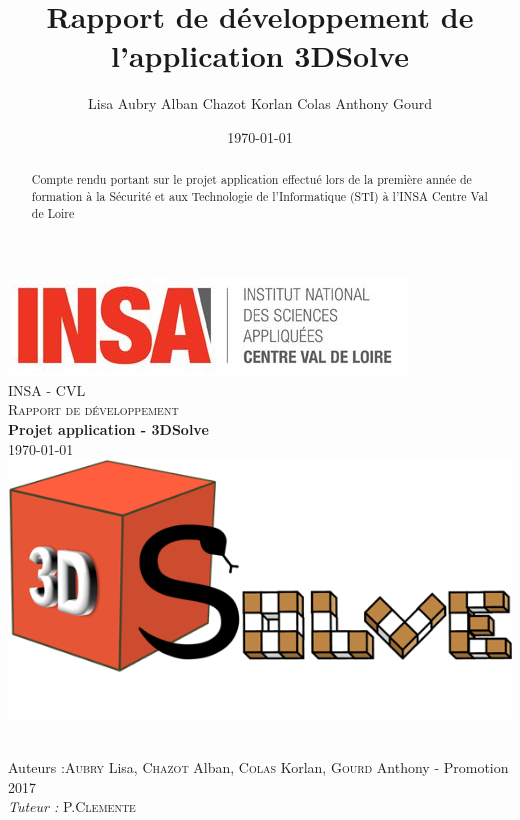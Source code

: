 \documentclass[a4paper,10pt]{report}
\title{Rapport de développement de l'application 3DSolve}
\author{Lisa Aubry Alban Chazot Korlan Colas Anthony Gourd}
\date{\today}
\begin{document}
\begin{titlepage}
  \begin{center}

    \includegraphics[scale=1]{img/insacvl.jpg}~\\[1.5cm]

    \textsc{\LARGE INSA - CVL}\\[2cm]

    \textsc{\Large Rapport de développement}\\[1.5cm]

    { \huge \bfseries Projet application - 3DSolve\\[0.4cm] }
    \today \\[1.5cm]
    
    \includegraphics[scale=1]{img/Logo.png}~\\[1.5cm]
    
    \vfill

    Auteurs :\textsc{Aubry} Lisa, \textsc{Chazot} Alban, \textsc{Colas} Korlan, \textsc{Gourd} Anthony - Promotion 2017\\
    \emph{Tuteur :} P.\textsc{Clemente}\\
  \end{center}
\end{titlepage}

\begin{abstract}
Compte rendu portant sur le projet application effectué lors de la première année de formation à la Sécurité et aux Technologie de l'Informatique (STI) à l'INSA Centre Val de Loire
\end{abstract}
\end{document}
